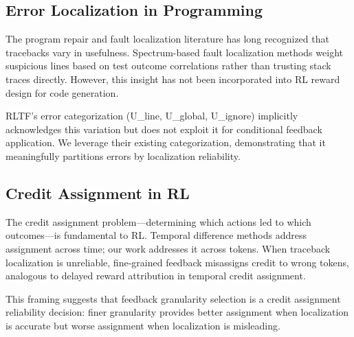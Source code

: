 \subsection{Error Localization in Programming}

The program repair and fault localization literature has long recognized that tracebacks vary in usefulness. Spectrum-based fault localization methods weight suspicious lines based on test outcome correlations rather than trusting stack traces directly. However, this insight has not been incorporated into RL reward design for code generation.

RLTF's error categorization (U\_line, U\_global, U\_ignore) implicitly acknowledges this variation but does not exploit it for conditional feedback application. We leverage their existing categorization, demonstrating that it meaningfully partitions errors by localization reliability.

\subsection{Credit Assignment in RL}

The credit assignment problem---determining which actions led to which outcomes---is fundamental to RL. Temporal difference methods address assignment across time; our work addresses it across tokens. When traceback localization is unreliable, fine-grained feedback misassigns credit to wrong tokens, analogous to delayed reward attribution in temporal credit assignment.

This framing suggests that feedback granularity selection is a credit assignment reliability decision: finer granularity provides better assignment when localization is accurate but worse assignment when localization is misleading.
